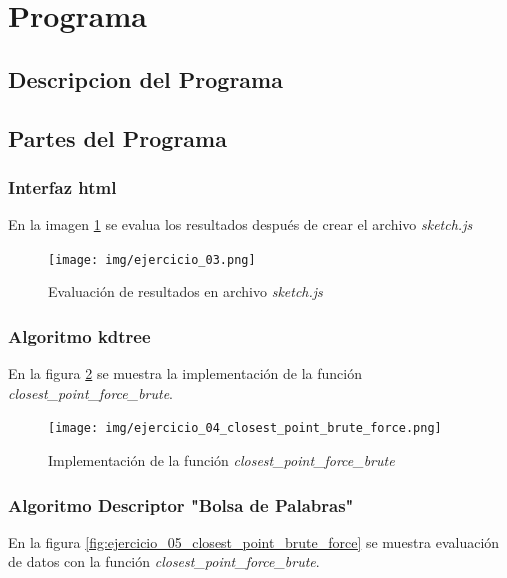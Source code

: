 \documentclass{article}
\begin{document}
\clearpage
\section{Programa}

\subsection{Descripcion del Programa}
\paragraph{}

\clearpage
\subsection{Partes del Programa}
\subsubsection{Interfaz html}
En la imagen \ref{fig:ejercicio_03} se evalua los resultados después de crear el archivo \textit{sketch.js}

\begin{figure}[h!]
	\centering
	\texttt{[image: img/ejercicio\_03.png]}
	\caption{Evaluación de resultados en archivo \textit{sketch.js}}
	\label{fig:ejercicio_03}
\end{figure}

\clearpage
\subsubsection{Algoritmo kdtree}
En la figura \ref{fig:ejercicio_04_closest_point_brute_force} se muestra la implementación de la función \textit{closest\_point\_force\_brute}.

\begin{figure}[h!]
	\centering
	\texttt{[image: img/ejercicio\_04\_closest\_point\_brute\_force.png]}
	\caption{Implementación de la función \textit{closest\_point\_force\_brute}}
	\label{fig:ejercicio_04_closest_point_brute_force}
\end{figure}

\clearpage
\subsubsection{Algoritmo Descriptor "Bolsa de Palabras"}
En la figura \ref{fig:ejercicio_05_closest_point_brute_force} se muestra evaluación de datos con la función \textit{closest\_point\_force\_brute}.
\end{document}
